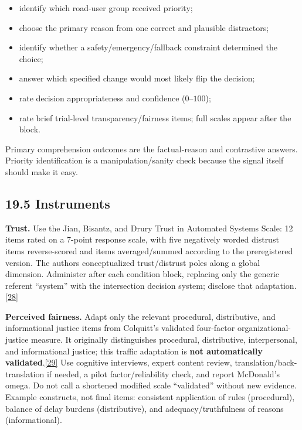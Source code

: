 \documentclass[
  english,
  11pt,
  a4paper,
]{article}
\providecommand{\tightlist}{%
  \setlength{\itemsep}{0pt}\setlength{\parskip}{0pt}}
\begin{document}
\begin{itemize}
\tightlist
\item
  identify which road-user group received priority;
\item
  choose the primary reason from one correct and plausible distractors;
\item
  identify whether a safety/emergency/fallback constraint determined the
  choice;
\item
  answer which specified change would most likely flip the decision;
\item
  rate decision appropriateness and confidence (\(0–100\));
\item
  rate brief trial-level transparency/fairness items; full scales appear
  after the block.
\end{itemize}

Primary comprehension outcomes are the factual-reason and contrastive
answers. Priority identification is a manipulation/sanity check because
the signal itself should make it easy.

\subsection{19.5 Instruments}\label{instruments}

\textbf{Trust.} Use the Jian, Bisantz, and Drury Trust in Automated
Systems Scale: 12 items rated on a 7-point response scale, with five
negatively worded distrust items reverse-scored and items
averaged/summed according to the preregistered version. The authors
conceptualized trust/distrust poles along a global dimension. Administer
after each condition block, replacing only the generic referent
``system'' with the intersection decision system; disclose that
adaptation.\hyperref[source-28]{[28]}

\textbf{Perceived fairness.} Adapt only the relevant procedural,
distributive, and informational justice items from Colquitt's validated
four-factor organizational-justice measure. It originally distinguishes
procedural, distributive, interpersonal, and informational justice; this
traffic adaptation is \textbf{not automatically
validated}.\hyperref[source-29]{[29]} Use cognitive interviews, expert
content review, translation/back-translation if needed, a pilot
factor/reliability check, and report McDonald's omega. Do not call a
shortened modified scale ``validated'' without new evidence. Example
constructs, not final items: consistent application of rules
(procedural), balance of delay burdens (distributive), and
adequacy/truthfulness of reasons (informational).
\end{document}
